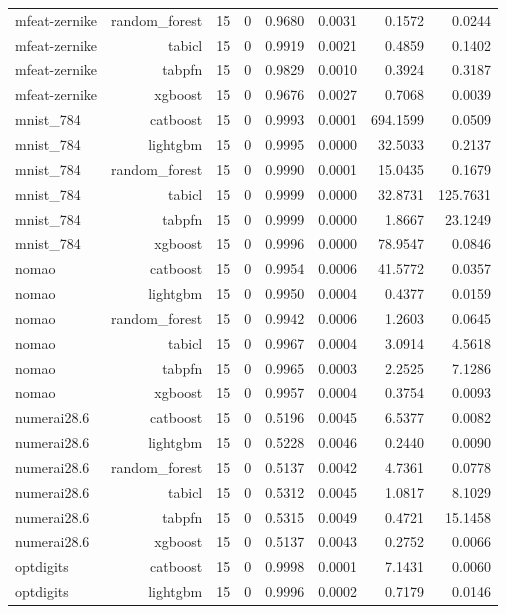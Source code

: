\begin{table}[htbp]
\begin{tabular}{lrrrrrrr}
mfeat-zernike & random\_forest & 15 & 0 & 0.9680 & 0.0031 & 0.1572 & 0.0244 \\
mfeat-zernike & tabicl & 15 & 0 & 0.9919 & 0.0021 & 0.4859 & 0.1402 \\
mfeat-zernike & tabpfn & 15 & 0 & 0.9829 & 0.0010 & 0.3924 & 0.3187 \\
mfeat-zernike & xgboost & 15 & 0 & 0.9676 & 0.0027 & 0.7068 & 0.0039 \\
mnist\_784 & catboost & 15 & 0 & 0.9993 & 0.0001 & 694.1599 & 0.0509 \\
mnist\_784 & lightgbm & 15 & 0 & 0.9995 & 0.0000 & 32.5033 & 0.2137 \\
mnist\_784 & random\_forest & 15 & 0 & 0.9990 & 0.0001 & 15.0435 & 0.1679 \\
mnist\_784 & tabicl & 15 & 0 & 0.9999 & 0.0000 & 32.8731 & 125.7631 \\
mnist\_784 & tabpfn & 15 & 0 & 0.9999 & 0.0000 & 1.8667 & 23.1249 \\
mnist\_784 & xgboost & 15 & 0 & 0.9996 & 0.0000 & 78.9547 & 0.0846 \\
nomao & catboost & 15 & 0 & 0.9954 & 0.0006 & 41.5772 & 0.0357 \\
nomao & lightgbm & 15 & 0 & 0.9950 & 0.0004 & 0.4377 & 0.0159 \\
nomao & random\_forest & 15 & 0 & 0.9942 & 0.0006 & 1.2603 & 0.0645 \\
nomao & tabicl & 15 & 0 & 0.9967 & 0.0004 & 3.0914 & 4.5618 \\
nomao & tabpfn & 15 & 0 & 0.9965 & 0.0003 & 2.2525 & 7.1286 \\
nomao & xgboost & 15 & 0 & 0.9957 & 0.0004 & 0.3754 & 0.0093 \\
numerai28.6 & catboost & 15 & 0 & 0.5196 & 0.0045 & 6.5377 & 0.0082 \\
numerai28.6 & lightgbm & 15 & 0 & 0.5228 & 0.0046 & 0.2440 & 0.0090 \\
numerai28.6 & random\_forest & 15 & 0 & 0.5137 & 0.0042 & 4.7361 & 0.0778 \\
numerai28.6 & tabicl & 15 & 0 & 0.5312 & 0.0045 & 1.0817 & 8.1029 \\
numerai28.6 & tabpfn & 15 & 0 & 0.5315 & 0.0049 & 0.4721 & 15.1458 \\
numerai28.6 & xgboost & 15 & 0 & 0.5137 & 0.0043 & 0.2752 & 0.0066 \\
optdigits & catboost & 15 & 0 & 0.9998 & 0.0001 & 7.1431 & 0.0060 \\
optdigits & lightgbm & 15 & 0 & 0.9996 & 0.0002 & 0.7179 & 0.0146 \\

\end{tabular}
\end{table}
